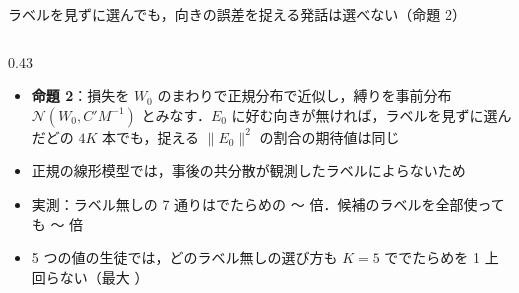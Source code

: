 \begin{frame}{ラベルを見ずに選んでも，向きの誤差を捉える発話は選べない（命題 2）}
\begin{columns}[T,onlytextwidth]
\begin{column}{0.43\textwidth}
      \begin{itemize}\scriptsize\setlength{\itemsep}{5pt}
        \item \textbf{命題 2}：損失を $W_0$ のまわりで正規分布で近似し，縛りを事前分布 $\mathcal{N}(W_0, C'M^{-1})$ とみなす．$E_0$ に好む向きが無ければ，ラベルを見ずに選んだどの $4K$ 本でも，捉える $\|E_0\|^2$ の割合の期待値は同じ
        \item 正規の線形模型では，事後の共分散が観測したラベルによらないため
        \item 実測：ラベル無しの 7 通りはでたらめの 〜 倍．候補のラベルを全部使っても 〜 倍
        \item 5 つの値の生徒では，どのラベル無しの選び方も $K=5$ ででたらめを 1 \pt 上回らない（最大 ）
      \end{itemize}
    \end{column}
  \end{columns}
\end{frame}

